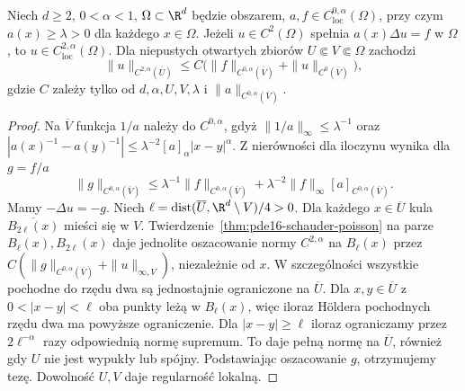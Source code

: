 \begin{twierdzenie}
\label{thm:pde16-scalar-schauder}
Niech $d\ge2$, $0<\alpha<1$, $\Omega\subset\R^d$ będzie obszarem,
$a,f\in C^{0,\alpha}_{\mathrm{loc}}(\Omega)$, przy czym
$a(x)\ge\lambda>0$ dla każdego $x\in\Omega$.
Jeżeli $u\in C^2(\Omega)$ spełnia $a(x)\Delta u=f$ w $\Omega$,
to $u\in C^{2,\alpha}_{\mathrm{loc}}(\Omega)$.
Dla niepustych otwartych zbiorów $U\Subset V\Subset\Omega$
zachodzi
\[
 \|u\|_{C^{2,\alpha}(\overline U)}
 \le C\bigl(\|f\|_{C^{0,\alpha}(\overline V)}
 +\|u\|_{C^0(\overline V)}\bigr),
\]
gdzie $C$ zależy tylko od $d,\alpha,U,V,\lambda$ i
$\|a\|_{C^{0,\alpha}(\overline V)}$.
\end{twierdzenie}
\begin{proof}
Na $\overline V$ funkcja $1/a$ należy do $C^{0,\alpha}$,
gdyż $\|1/a\|_\infty\le\lambda^{-1}$ oraz
$|a(x)^{-1}-a(y)^{-1}|
\le\lambda^{-2}[a]_\alpha|x-y|^\alpha$.
Z nierówności dla iloczynu wynika dla $g=f/a$
\[
 \|g\|_{C^{0,\alpha}(\overline V)}
 \le\lambda^{-1}\|f\|_{C^{0,\alpha}(\overline V)}
 +\lambda^{-2}\|f\|_\infty[a]_{C^{0,\alpha}(\overline V)}.
\]
Mamy $-\Delta u=-g$. Niech
$\ell=\operatorname{dist}(\overline U,\R^d\setminus V)/4>0$.
Dla każdego $x\in\overline U$ kula
$\overline{B_{2\ell}(x)}$ mieści się w $V$.
Twierdzenie~\ref{thm:pde16-schauder-poisson}
na parze $B_\ell(x),B_{2\ell}(x)$ daje jednolite
oszacowanie normy $C^{2,\alpha}$ na $B_\ell(x)$
przez $C(\|g\|_{C^{0,\alpha}(\overline V)}
+\|u\|_{\infty,V})$, niezależnie od $x$.
W szczególności wszystkie pochodne do rzędu dwa
są jednostajnie ograniczone na $\overline U$.
Dla $x,y\in\overline U$ z $0<|x-y|<\ell$
oba punkty leżą w $B_\ell(x)$, więc iloraz Höldera
pochodnych rzędu dwa ma powyższe ograniczenie.
Dla $|x-y|\ge\ell$ iloraz ograniczamy przez
$2\ell^{-\alpha}$ razy odpowiednią normę supremum.
To daje pełną normę na $\overline U$,
również gdy $U$ nie jest wypukły lub spójny.
Podstawiając oszacowanie $g$, otrzymujemy tezę.
Dowolność $U,V$ daje regularność lokalną.
\end{proof}

